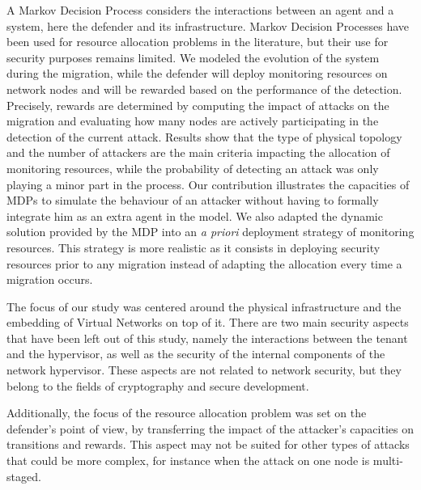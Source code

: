 A Markov Decision Process considers the interactions between an agent and a system, here the defender and its infrastructure. Markov Decision Processes have been used for resource allocation problems in the literature, but their use for security purposes remains limited. We modeled the evolution of the system during the migration, while the defender will deploy monitoring resources on network nodes and will be rewarded based on the performance of the detection.
Precisely, rewards are determined by computing the impact of attacks on the migration and evaluating how many nodes are actively participating in the detection of the current attack.
Results show that the type of physical topology and the number of attackers are the main criteria impacting the allocation of monitoring resources, while the probability of detecting an attack was only playing a minor part in the process. 
Our contribution illustrates the capacities of MDPs to simulate the behaviour of an attacker without having to formally integrate him as an extra agent in the model.
We also adapted the dynamic solution provided by the MDP into an \textit{a priori} deployment strategy of monitoring resources. This strategy is more realistic as it consists in deploying security resources prior to any migration instead of adapting the allocation every time a migration occurs.

The focus of our study was centered around the physical infrastructure and the embedding of Virtual Networks on top of it.
There are two main security aspects that have been left out of this study, namely the interactions between the tenant and the hypervisor, as well as the security of the internal components of the network hypervisor. These aspects are not related to network security, but they belong to the fields of cryptography and secure development.

Additionally, the focus of the resource allocation problem was set on the defender's point of view, by transferring the impact of the attacker's capacities on transitions and rewards. This aspect may not be suited for other types of attacks that could be more complex, for instance when the attack on one node is multi-staged.


